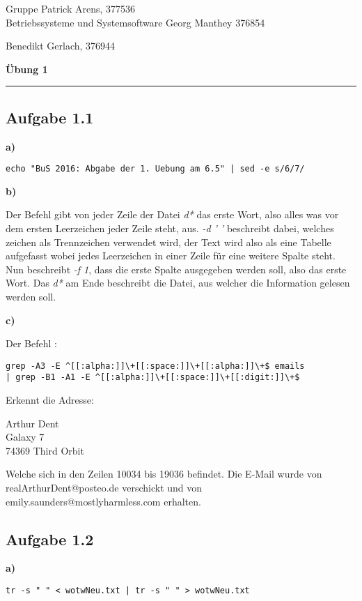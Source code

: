 \documentclass[a4paper,graphics,11pt]{article}
\newcommand{\aufgabe}[1]{\subsection*{Aufgabe #1}}
\begin{document}
\noindent Gruppe              \hfill Patrick Arens, 377536\\
\noindent Betriebssysteme und Systemsoftware    \hfill Georg Manthey 376854\\
\strut\hfill Benedikt Gerlach, 376944\\
\begin{center}
	\LARGE{\textbf{Übung 1}}
\end{center}
\begin{center}
\rule[0.1ex]{\textwidth}{1pt}
\end{center}

\aufgabe{1.1}
\textbf{a)}

\begin{verbatim}
echo "BuS 2016: Abgabe der 1. Uebung am 6.5" | sed -e s/6/7/
\end{verbatim}

\textbf{b)}

Der Befehl gibt von jeder Zeile der Datei \textit{d*} das erste Wort, also alles was vor dem ersten Leerzeichen jeder Zeile steht, aus. \textit{-d ' '} beschreibt dabei, welches zeichen als Trennzeichen verwendet wird, der Text wird also als eine Tabelle aufgefasst wobei jedes Leerzeichen in einer Zeile für eine weitere Spalte steht. Nun beschreibt \textit{-f 1}, dass die erste Spalte ausgegeben werden soll, also das erste Wort. Das \textit{d*} am Ende beschreibt die Datei, aus welcher die Information gelesen werden soll.


\textbf{c)}

Der Befehl :

\begin{verbatim}
grep -A3 -E ^[[:alpha:]]\+[[:space:]]\+[[:alpha:]]\+$ emails 
| grep -B1 -A1 -E ^[[:alpha:]]\+[[:space:]]\+[[:digit:]]\+$
\end{verbatim}



Erkennt die Adresse:

Arthur Dent\\
Galaxy 7\\
74369 Third Orbit

Welche sich in den Zeilen 10034 bis 19036 befindet. Die E-Mail wurde von realArthurDent@posteo.de verschickt und von emily.saunders@mostlyharmless.com erhalten.\\

\newpage

\aufgabe{1.2}
\textbf{a)}
\begin{verbatim}
tr -s " " < wotwNeu.txt | tr -s " " > wotwNeu.txt
\end{verbatim}
\end{document}
